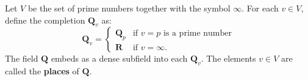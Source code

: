 Let $V$ be the set of prime numbers together with the symbol $\infty$. For each $v \in V$, define the completion $\mathbf{Q}_v$ as:
$$
\mathbf{Q}_v = \begin{cases}
\mathbf{Q}_p & \text{if } v = p \text{ is a prime number} \\
\mathbf{R} & \text{if } v = \infty.
\end{cases}
$$
The field $\mathbf{Q}$ embeds as a dense subfield into each $\mathbf{Q}_v$. The elements $v \in V$ are called the \textbf{places} of $\mathbf{Q}$.
